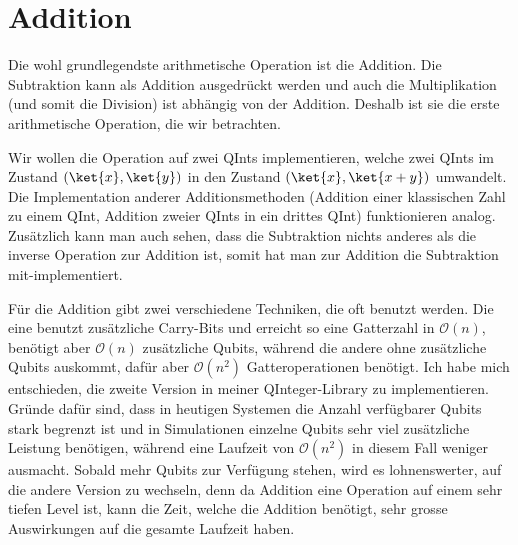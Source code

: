 

\section{Addition}
Die wohl grundlegendste arithmetische Operation ist die Addition. Die Subtraktion kann als Addition ausgedrückt werden und auch die Multiplikation (und somit die Division) ist abhängig von der Addition. Deshalb ist sie die erste arithmetische Operation, die wir betrachten. 

Wir wollen die Operation auf zwei QInts implementieren, welche zwei QInts im Zustand $(\ket{x}, \ket{y})$ in den Zustand $(\ket{x}, \ket{x + y})$ umwandelt. Die Implementation anderer Additionsmethoden (Addition einer klassischen Zahl zu einem QInt, Addition zweier QInts in ein drittes QInt) funktionieren analog. Zusätzlich kann man auch sehen, dass die Subtraktion nichts anderes als die inverse Operation zur Addition ist, somit hat man zur Addition die Subtraktion mit-implementiert.

Für die Addition gibt zwei verschiedene Techniken, die oft benutzt werden. Die eine benutzt zusätzliche Carry-Bits und erreicht so eine Gatterzahl in $\mathcal O(n)$, benötigt aber $\mathcal O(n)$ zusätzliche Qubits, während die andere ohne zusätzliche Qubits auskommt, dafür aber $\mathcal O(n^2)$ Gatteroperationen benötigt. Ich habe mich entschieden, die zweite Version in meiner QInteger-Library zu implementieren. Gründe dafür sind, dass in heutigen Systemen die Anzahl verfügbarer Qubits stark begrenzt ist und in Simulationen einzelne Qubits sehr viel zusätzliche Leistung benötigen, während eine Laufzeit von $\mathcal O(n^2)$ in diesem Fall weniger ausmacht. Sobald mehr Qubits zur Verfügung stehen, wird es lohnenswerter, auf die andere Version zu wechseln, denn da Addition eine Operation auf einem sehr tiefen Level ist, kann die Zeit, welche die Addition benötigt, sehr grosse Auswirkungen auf die gesamte Laufzeit haben.

